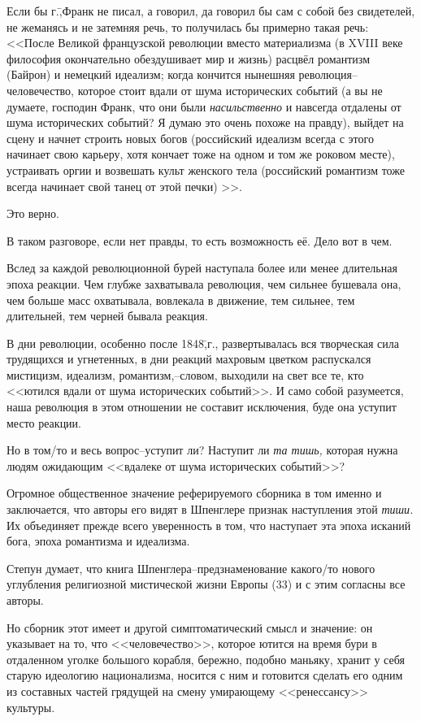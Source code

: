Если бы г.\=,Франк не писал, а говорил, да говорил бы сам с собой без свидетелей, не жеманясь и не затемняя речь, то получилась бы примерно такая речь: <<После Великой французской революции вместо материализма (\glqq в XVIII веке философия окончательно обездушивает мир и жизнь\grqq) расцвёл романтизм (Байрон) и немецкий идеализм; когда кончится нынешняя революция\---человечество, которое стоит вдали от шума исторических событий (а вы не думаете, господин Франк, что они были \emph{насильственно} и навсегда отдалены от шума исторических событий? Я думаю это очень похоже на правду), выйдет на сцену и начнет строить новых богов (российский идеализм всегда с этого начинает свою карьеру, хотя кончает тоже на одном и том же роковом месте), устраивать оргии и возвешать культ женского тела (российский романтизм тоже всегда начинает свой танец от этой печки) >>.

Это верно.

В таком разговоре, если нет правды, то есть возможность её. Дело вот в чем.

Вслед за каждой революционной бурей наступала более или менее длительная эпоха реакции. Чем глубже захватывала революция, чем сильнее бушевала она, чем больше масс охватывала, вовлекала в движение, тем сильнее, тем длительней, тем черней бывала реакция.

В дни революции, особенно после 1848\=,г., развертывалась вся творческая сила трудящихся и угнетенных, в дни реакций махровым цветком распускался мистицизм, идеализм, романтизм,\---словом, выходили на свет все те, кто <<ютился вдали от шума исторических событий>>. И само собой разумеется, наша революция в этом отношении не составит исключения, буде она уступит место реакции.

Но в том\-/то и весь вопрос\---уступит ли? Наступит ли \emph{та тишь,} которая нужна людям ожидающим <<вдалеке от шума исторических событий>>?

Огромное общественное значение реферируемого сборника в том именно и заключается, что авторы его видят в Шпенглере признак наступления этой \emph{тиши.} Их объединяет прежде всего уверенность в том, что наступает эта эпоха исканий бога, эпоха романтизма и идеализма.

Степун думает, что книга Шпенглера\---предзнаменование какого\-/то нового углубления религиозной мистической жизни Европы (33) и с этим согласны все авторы.

Но сборник этот имеет и другой симптоматический смысл и значение: он указывает на то, что <<человечество>>, которое ютится на время бури в отдаленном уголке большого корабля, бережно, подобно маньяку, хранит у себя старую идеологию национализма, носится с ним и готовится сделать его одним из составных частей грядущей на смену умирающему <<ренессансу>> культуры.


